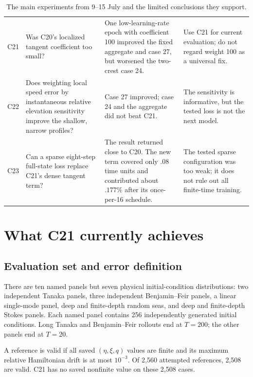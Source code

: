 \documentclass[11pt]{article}
\begin{document}
\begin{table}[htbp]
\begin{tabularx}{\textwidth}{p{}p{}X p{}}
C21
& Was C20's localized tangent coefficient too small?
& One low-learning-rate epoch with coefficient 100 improved the fixed aggregate
and case 27, but worsened the two-crest case 24.
& Use C21 for current evaluation; do not regard weight 100 as a universal fix. \\

C22
& Does weighting local speed error by instantaneous relative elevation
sensitivity improve the shallow, narrow profiles?
& Case 27 improved; case 24 and the aggregate did not beat C21.
& The sensitivity is informative, but the tested loss is not the next model. \\

C23
& Can a sparse eight-step full-state loss replace C21's dense tangent term?
& The result returned close to C20.  The new term covered only $.08$ time units
and contributed about $.177\%$ after its once-per-16 schedule.
& The tested sparse configuration was too weak; it does not rule out all
finite-time training. \\
\bottomrule
\end{tabularx}
\caption{The main experiments from 9--15 July and the limited conclusions they
support.}
\label{tab:experiments}
\end{table}

\section{What C21 currently achieves}

\subsection{Evaluation set and error definition}

There are ten named panels but seven physical initial-condition distributions:
two independent Tanaka panels, three independent Benjamin--Feir panels, a
linear single-mode panel, deep and finite-depth random seas, and deep and
finite-depth Stokes panels.  Each named panel contains 256 independently
generated initial conditions.  Long Tanaka and Benjamin--Feir rollouts end at
$T=200$; the other panels end at $T=20$.

A reference is valid if all saved $(\eta,\xi,q)$ values are finite and its
maximum relative Hamiltonian drift is at most $10^{-3}$.  Of 2,560 attempted
references, 2,508 are valid.  C21 has no saved nonfinite value on these 2,508
cases.
\end{document}
